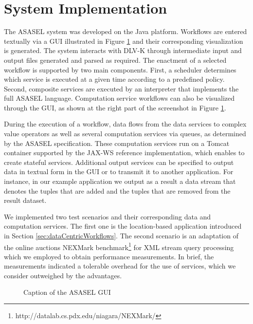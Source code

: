 
\section{System Implementation} \label{sec:systemImplementation}
	
The ASASEL system was developed on the Java platform. Workflows are entered textually via a GUI illustrated in Figure \ref{fig:asaselGUI} and their corresponding visualization is generated. The system interacts with DLV-K through intermediate input and output files generated and parsed as required. The enactment of a selected workflow is supported by two main components. First, a scheduler determines which service is executed at a given time according to a predefined policy. Second, composite services are executed by an interpreter that implements the full ASASEL language. Computation service workflows can also be visualized through the GUI, as shown at the right part of the screenshot in Figure \ref{fig:asaselGUI}.
	
During the execution of a workflow, data flows from the data services to complex value operators as well as several computation services via queues, as determined by the ASASEL specification. These computation services run on a Tomcat container supported by the JAX-WS reference implementation, which enables to create stateful services. Additional output services can be specified to output data in textual form in the GUI or to transmit it to another application. For instance, in our example application we output as a result a data stream that denotes the tuples that are added and the tuples that are removed from the result dataset.
	
We implemented two test scenarios and their corresponding data and computation services. The first one is the location-based application introduced in Section \ref{sec:dataCentricWorkflows}. The second scenario is an adaptation of the online auctions NEXMark benchmark\footnote{http://datalab.cs.pdx.edu/niagara/NEXMark/} for XML stream query processing which we employed to obtain performance measurements. In brief, the measurements indicated a tolerable overhead for the use of services, which we consider outweighed by the advantages.
	
\begin{figure}
   \begin{center}
   \end{center}
   \caption{Caption of the ASASEL GUI}
   \label{fig:asaselGUI}
\end{figure}

